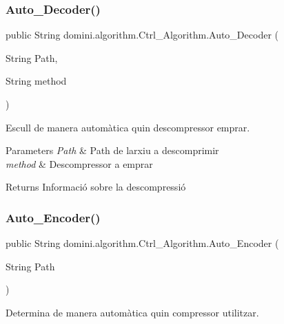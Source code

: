 \subsubsection{\texorpdfstring{Auto\+\_\+\+Decoder()}{Auto\_Decoder()}}
{\footnotesize\ttfamily public String domini.\+algorithm.\+Ctrl\+\_\+\+Algorithm.\+Auto\+\_\+\+Decoder (\begin{DoxyParamCaption}\item[{String}]{Path,  }\item[{String}]{method }\end{DoxyParamCaption})\hspace{0.3cm}{\ttfamily [inline]}}



Escull de manera automàtica quin descompressor emprar. 


\begin{DoxyParams}{Parameters}
{\em Path} & Path de l\textquotesingle{}arxiu a descomprimir \\
\hline
{\em method} & Descompressor a emprar \\
\hline
\end{DoxyParams}
\begin{DoxyReturn}{Returns}
Informació sobre la descompressió 
\end{DoxyReturn}
\mbox{\label{classdomini_1_1algorithm_1_1Ctrl__Algorithm_a6f7a706e07d4e6f8c1ea293d06e17318}} 
\subsubsection{\texorpdfstring{Auto\+\_\+\+Encoder()}{Auto\_Encoder()}}
{\footnotesize\ttfamily public String domini.\+algorithm.\+Ctrl\+\_\+\+Algorithm.\+Auto\+\_\+\+Encoder (\begin{DoxyParamCaption}\item[{String}]{Path }\end{DoxyParamCaption})\hspace{0.3cm}{\ttfamily [inline]}}



Determina de manera automàtica quin compressor utilitzar. 


